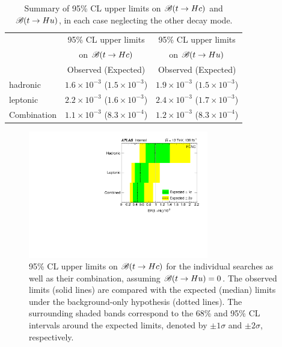 \begin{table}[t!]
\caption{\small{Summary of 95\% CL upper limits on $\mathscr{B}(t \to Hc)$ and $\mathscr{B}(t \to Hu)$, in each case neglecting the other decay mode. }}
\begin{center}
\begin{tabular}{lcc}
\toprule\toprule
 & \multicolumn{1}{c}{95\% CL upper limits} & \multicolumn{1}{c}{95\% CL upper limits}  \\
 & \multicolumn{1}{c}{on $\mathscr{B}(t \to Hc)$} & \multicolumn{1}{c}{on $\mathscr{B}(t \to Hu)$} \\
 &  Observed (Expected) & Observed (Expected)  \\
\midrule\midrule
hadronic  & $1.6 \times 10^{-3}$ ($1.5 \times 10^{-3}$) & $1.9 \times 10^{-3}$ ($1.5 \times 10^{-3}$) \\ 
leptonic & $2.2 \times 10^{-3}$ ($1.6 \times 10^{-3}$) & $2.4 \times 10^{-3}$ ($1.7 \times 10^{-3}$) \\
\midrule
Combination  & $1.1 \times 10^{-3}$ ($8.3 \times 10^{-4}$) & $1.2 \times 10^{-3}$ ($8.3 \times 10^{-4}$) \\
\bottomrule\bottomrule
\end{tabular}
\label{tab:limits_summary}
\end{center}
\end{table}

\begin{figure}[h!]
\begin{center}
\includegraphics[width=0.7\textwidth]{figures/tcH_combined_Limit.pdf}
\caption{\small {95\% CL upper limits on $\mathscr{B}(t\to Hc)$ for the individual searches as well as their
combination, assuming $\mathscr{B}(t\to Hu)=0$. The observed limits (solid lines) are compared with the 
expected (median) limits under the background-only
hypothesis (dotted lines). The surrounding shaded bands correspond to the 68\% and 95\% CL intervals around the expected limits, 
denoted by $\pm 1\sigma$ and $\pm 2\sigma$, respectively.
}}
\label{fig:limits_combo_1D_hc} 
\end{center}
\end{figure}

